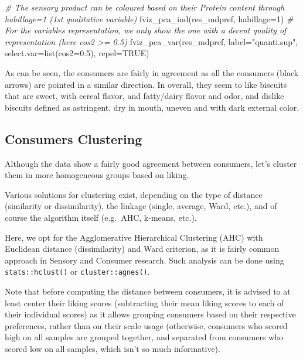\documentclass[
]{book}
\newenvironment{Shaded}{\begin{snugshade}}{\end{snugshade}}
\newcommand{\AttributeTok}[1]{\textcolor[rgb]{0.77,0.63,0.00}{#1}}
\newcommand{\CommentTok}[1]{\textcolor[rgb]{0.56,0.35,0.01}{\textit{#1}}}
\newcommand{\ConstantTok}[1]{\textcolor[rgb]{0.00,0.00,0.00}{#1}}
\newcommand{\DecValTok}[1]{\textcolor[rgb]{0.00,0.00,0.81}{#1}}
\newcommand{\FloatTok}[1]{\textcolor[rgb]{0.00,0.00,0.81}{#1}}
\newcommand{\FunctionTok}[1]{\textcolor[rgb]{0.00,0.00,0.00}{#1}}
\newcommand{\NormalTok}[1]{#1}
\newcommand{\StringTok}[1]{\textcolor[rgb]{0.31,0.60,0.02}{#1}}
\begin{document}
\begin{Shaded}
\begin{Highlighting}[]
\CommentTok{\# The sensory product can be coloured based on their Protein content through habillage=1 (1st qualitative variable)}
\FunctionTok{fviz\_pca\_ind}\NormalTok{(res\_mdpref, }\AttributeTok{habillage=}\DecValTok{1}\NormalTok{)}
\CommentTok{\# For the variables representation, we only show the one with a decent quality of representation (here cos2 \textgreater{}= 0.5)}
\FunctionTok{fviz\_pca\_var}\NormalTok{(res\_mdpref, }\AttributeTok{label=}\StringTok{"quanti.sup"}\NormalTok{, }\AttributeTok{select.var=}\FunctionTok{list}\NormalTok{(}\AttributeTok{cos2=}\FloatTok{0.5}\NormalTok{), }\AttributeTok{repel=}\ConstantTok{TRUE}\NormalTok{)}
\end{Highlighting}
\end{Shaded}

As can be seen, the consumers are fairly in agreement as all the consumers (black arrows) are pointed in a similar direction.
In overall, they seem to like biscuits that are sweet, with cereal flavor, and fatty/dairy flavor and odor, and dislike biscuits defined as astringent, dry in mouth, uneven and with dark external color.

\hypertarget{consumers-clustering}{%
\subsection{Consumers Clustering}\label{consumers-clustering}}

Although the data show a fairly good agreement between consumers, let's cluster them in more homogeneous groups based on liking.

Various solutions for clustering exist, depending on the type of distance (similarity or dissimilarity), the linkage (single, average, Ward, etc.), and of course the algorithm itself (e.g.~AHC, k-means, etc.).

Here, we opt for the Agglomerative Hierarchical Clustering (AHC) with Euclidean distance (dissimilarity) and Ward criterion, as it is fairly common approach in Sensory and Consumer research. Such analysis can be done using \texttt{stats::hclust()} or \texttt{cluster::agnes()}.

Note that before computing the distance between consumers, it is advised to at least center their liking scores (subtracting their mean liking scores to each of their individual scores) as it allows grouping consumers based on their respective preferences, rather than on their scale usage (otherwise, consumers who scored high on all samples are grouped together, and separated from consumers who scored low on all samples, which isn't so much informative).
\end{document}
